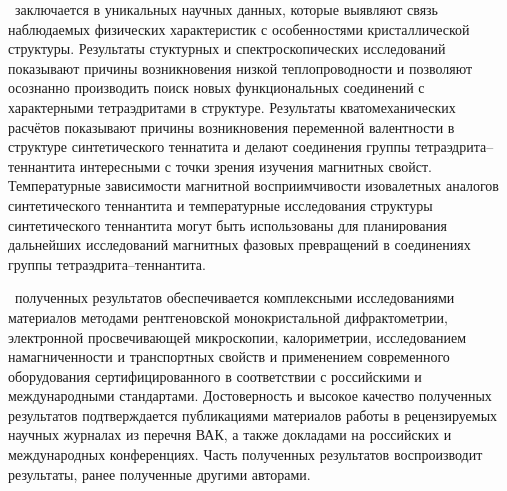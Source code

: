 \influence\ заключается в уникальных научных данных, которые выявляют связь наблюдаемых физических характеристик с особенностями кристаллической структуры. 
Результаты стуктурных и спектроскопических исследований показывают причины возникновения низкой теплопроводности и позволяют осознанно производить поиск новых функциональных соединений с характерными тетраэдритами в структуре. Результаты кватомеханических расчётов показывают причины возникновения переменной валентности в структуре синтетического теннатита и делают соединения группы тетраэдрита--теннантита интересными с точки зрения изучения магнитных свойст.
Температурные зависимости магнитной восприимчивости изовалетных аналогов синтетического теннантита и температурные исследования структуры синтетического теннантита могут быть использованы для планирования дальнейших исследований магнитных фазовых превращений в соединениях группы тетраэдрита--теннантита.

\reliability\ полученных результатов обеспечивается комплексными
исследованиями материалов  методами рентгеновской монокристальной дифрактометрии, электронной просвечивающей микроскопии, калориметрии, исследованием намагниченности и транспортных свойств и применением современного оборудования
сертифицированного в соответствии с российскими и международными стандартами.
Достоверность и высокое качество полученных результатов
подтверждается публикациями материалов работы в рецензируемых научных журналах из перечня ВАК, а также докладами на российских и международных 
конференциях.
Часть полученных результатов воспроизводит результаты, ранее полученные другими авторами.

